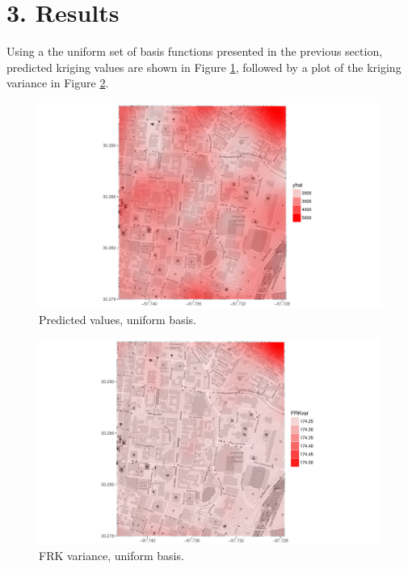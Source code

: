 \documentclass[11pt]{article}
\begin{document}
\newpage
\section{3. Results}

Using a the uniform set of basis functions presented in the previous section, predicted kriging values are shown in Figure \ref{fig:4}, followed by a plot of the kriging variance in Figure \ref{fig:5}. 

\begin{figure}[H]
\centering
\includegraphics[width=0.8\columnwidth]{Images/pred.pdf}
\caption{Predicted values, uniform basis.}
\label{fig:4}
\end{figure}

\begin{figure}[H]
\centering
\includegraphics[width=0.8\columnwidth]{Images/var.pdf}
\caption{FRK variance, uniform basis.}
\label{fig:5}
\end{figure}
\end{document}
